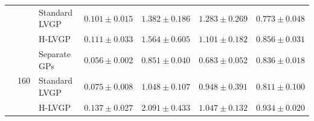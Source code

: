 \begin{table}[htbp]
\begin{tabular}{lllrrrr}
 &  & Standard LVGP & $0.101 \pm 0.015$ & $1.382 \pm 0.186$ & $1.283 \pm 0.269$ & $0.773 \pm 0.048$ \\
 &  & H-LVGP & $0.111 \pm 0.033$ & $1.564 \pm 0.605$ & $1.101 \pm 0.182$ & $0.856 \pm 0.031$ \\
\cmidrule(lr){2-7}
 & \multirow{3}{*}{160} & Separate GPs & \colorbox{green!20}{\boldmath$0.056 \pm 0.002$} & \colorbox{green!20}{\boldmath$0.851 \pm 0.040$} & \colorbox{green!20}{\boldmath$0.683 \pm 0.052$} & $0.836 \pm 0.018$ \\
 &  & Standard LVGP & $0.075 \pm 0.008$ & $1.048 \pm 0.107$ & $0.948 \pm 0.391$ & $0.811 \pm 0.100$ \\
 &  & H-LVGP & $0.137 \pm 0.027$ & $2.091 \pm 0.433$ & $1.047 \pm 0.132$ & \colorbox{green!20}{\boldmath$0.934 \pm 0.020$} \\
\bottomrule
\end{tabular}
\end{table}
